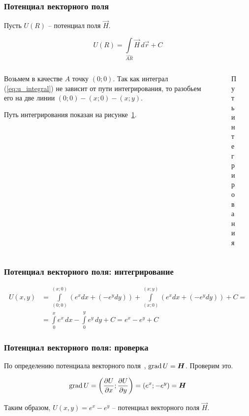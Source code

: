 \begin{frame}\frametitle{Потенциал векторного поля}
	Пусть \(U(R)\) -- потенциал поля \(\vec H\).

	\begin{equation}
		U(R) =
		\int\limits_{\widehat{AR}} \vec H \, d \vec r + C
		\label{eq:u_integral}
	\end{equation}


	\begin{columns}
		\begin{column}{0.5\textwidth}
			Возьмем в качестве $A$ точку $(0; 0)$.
			Так как интеграл (\ref{eq:u_integral}) не зависит от пути интегрирования,
			то разобьем его на две линии $(0; 0) - (x; 0) - (x; y)$.

			Путь интегрирования показан на рисунке~\ref{fig:integration_path}.
		\end{column}
		\begin{column}{0.5\textwidth}
			\begin{figure}
				\centering
				\caption{Путь интегрирования}\label{fig:integration_path}
			\end{figure}
		\end{column}
	\end{columns}

\end{frame}

\begin{frame}\frametitle{Потенциал векторного поля: интегрирование}
	\begin{align*}
		U(x, y) & = \int\limits_{(0; 0)}^{(x; 0)} \left(e^x dx + (-e^y dy) \right) +
		\int\limits_{(x; 0)}^{(x; y)} \left(e^x dx + (-e^y dy) \right) + C =         \\
		        & =
		\int\limits_{0}^{x} e^x \, dx - \int\limits_{0}^{y} e^y \, dy + C =
		e^{x} - e^{y} + C
	\end{align*}
\end{frame}

\begin{frame}\frametitle{Потенциал векторного поля: проверка}
	По определению потенциала векторного поля~\cite[ст.~269]{zorich}, $\grad U = \vec H$. Проверим это.

	\begin{equation*}
		\grad U =
		\left( \frac{\partial U}{\partial x}; \frac{\partial U}{\partial y} \right) =
		\left( e^x; -e^y \right)
		= \vec H
	\end{equation*}

	Таким образом, \(U(x,y) = e^{x} - e^{y}\) -- потенциал векторного поля \(\vec H\).
\end{frame}

